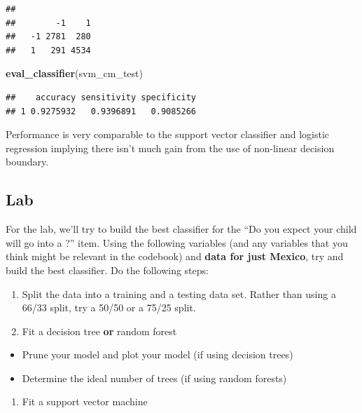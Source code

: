 \documentclass[]{book}
\newenvironment{Shaded}{\begin{snugshade}}{\end{snugshade}}
\newcommand{\KeywordTok}[1]{\textcolor[rgb]{0.13,0.29,0.53}{\textbf{#1}}}
\newcommand{\NormalTok}[1]{#1}
\providecommand{\tightlist}{%
  \setlength{\itemsep}{0pt}\setlength{\parskip}{0pt}}
\begin{document}
\begin{verbatim}
##     
##        -1    1
##   -1 2781  280
##   1   291 4534
\end{verbatim}

\begin{Shaded}
\begin{Highlighting}[]
\KeywordTok{eval_classifier}\NormalTok{(svm_cm_test)}
\end{Highlighting}
\end{Shaded}

\begin{verbatim}
##    accuracy sensitivity specificity
## 1 0.9275932   0.9396891   0.9085266
\end{verbatim}

Performance is very comparable to the support vector classifier and logistic regression implying there isn't much gain from the use of non-linear decision boundary.

\hypertarget{lab-2}{%
\subsection{Lab}\label{lab-2}}

For the lab, we'll try to build the best classifier for the ``Do you expect your child will go into a ?'' item. Using the following variables (and any variables that you think might be relevant in the codebook) and \textbf{data for just Mexico}, try and build the best classifier. Do the following steps:

\begin{enumerate}
\def\labelenumi{\arabic{enumi}.}
\item
  Split the data into a training and a testing data set. Rather than using a 66/33 split, try a 50/50 or a 75/25 split.
\item
  Fit a decision tree \textbf{or} random forest
\end{enumerate}

\begin{itemize}
\tightlist
\item
  Prune your model and plot your model (if using decision trees)
\item
  Determine the ideal number of trees (if using random forests)
\end{itemize}

\begin{enumerate}
\def\labelenumi{\arabic{enumi}.}
\setcounter{enumi}{2}
\tightlist
\item
  Fit a support vector machine
\end{enumerate}
\end{document}
